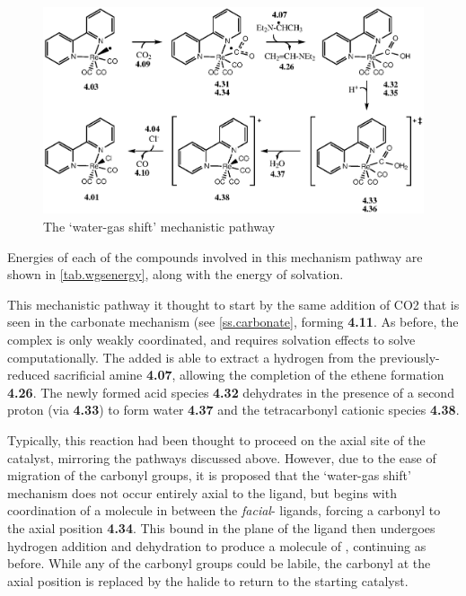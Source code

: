 \begin{figure}[!htb]
 \begin{center}
  \includegraphics[clip=true, width=\textwidth, keepaspectratio]{images/watergas.eps}
 \end{center}
\caption{The `water-gas shift' mechanistic pathway}
\label{fig.watergas}
\end{figure} 

Energies of each of the compounds involved in this mechanism pathway are shown in \autoref{tab.wgsenergy}, along with the energy of solvation.




This mechanistic pathway it thought to start by the same addition of CO2 that is seen in the carbonate mechanism (see \autoref{ss.carbonate}, forming \textbf{4.11}.  As before, the complex is only weakly coordinated, and requires solvation effects to solve computationally. The added  is able to extract a hydrogen from the previously-reduced sacrificial amine \textbf{4.07}, allowing the completion of the ethene formation \textbf{4.26}. The newly formed acid species \textbf{4.32} dehydrates in the presence of a second proton (via \textbf{4.33}) to form water \textbf{4.37} and the tetracarbonyl cationic species \textbf{4.38}. 

Typically, this reaction had been thought to proceed on the axial site of the catalyst, mirroring the pathways discussed above. However, due to the ease of migration of the carbonyl groups, it is proposed that the `water-gas shift' mechanism does not occur entirely axial to the ligand, but begins with coordination of a  molecule in between the \textit{facial}- ligands, forcing a carbonyl to the axial position \textbf{4.34}. This  bound in the plane of the ligand then undergoes hydrogen addition and dehydration to produce a molecule of , continuing as before. While any of the carbonyl groups could be labile, the carbonyl at the axial position is replaced by the halide to return to the starting catalyst\autocite{shaver1992}. 

